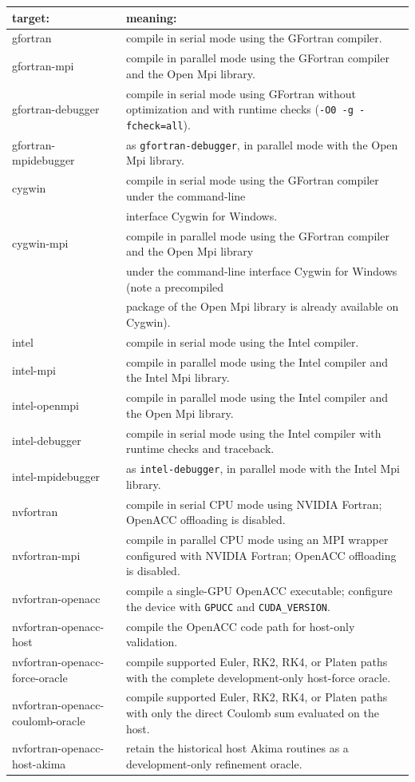 \begin{table}[H]
\begin{centering}
\begin{tabular}{p{}p{}}
\hline
\textbf{target:}  & \textbf{meaning:}\tabularnewline
\hline
\hline
gfortran  & compile in serial mode using the GFortran compiler.\tabularnewline
gfortran-mpi  & compile in parallel mode using the GFortran compiler and the Open
Mpi library.\tabularnewline
gfortran-debugger & compile in serial mode using GFortran without optimization and
with runtime checks (\texttt{-O0 -g -fcheck=all}).\tabularnewline
gfortran-mpidebugger & as \texttt{gfortran-debugger}, in parallel mode with the Open
Mpi library.\tabularnewline
cygwin  & compile in serial mode using the GFortran compiler under the command-line\tabularnewline
 & interface Cygwin for Windows.\tabularnewline
cygwin-mpi  & compile in parallel mode using the GFortran compiler and the Open
Mpi library\tabularnewline
 & under the command-line interface Cygwin for Windows (note a precompiled\tabularnewline
 & package of the Open Mpi library is already available on Cygwin).\tabularnewline
intel  & compile in serial mode using the Intel compiler.\tabularnewline
intel-mpi  & compile in parallel mode using the Intel compiler and the Intel Mpi
library.\tabularnewline
intel-openmpi  & compile in parallel mode using the Intel compiler and the Open Mpi
library.\tabularnewline
intel-debugger & compile in serial mode using the Intel compiler with runtime checks
and traceback.\tabularnewline
intel-mpidebugger & as \texttt{intel-debugger}, in parallel mode with the Intel Mpi
library.\tabularnewline
nvfortran & compile in serial CPU mode using NVIDIA Fortran; OpenACC offloading
is disabled.\tabularnewline
nvfortran-mpi & compile in parallel CPU mode using an MPI wrapper configured
with NVIDIA Fortran; OpenACC offloading is disabled.\tabularnewline
nvfortran-openacc & compile a single-GPU OpenACC executable; configure the
device with \texttt{GPUCC} and \texttt{CUDA\_VERSION}.\tabularnewline
nvfortran-openacc-host & compile the OpenACC code path for host-only validation.\tabularnewline
nvfortran-openacc-force-oracle & compile supported Euler, RK2, RK4, or Platen
paths with the complete development-only host-force oracle.\tabularnewline
nvfortran-openacc-coulomb-oracle & compile supported Euler, RK2, RK4, or Platen
paths with only the direct Coulomb sum evaluated on the host.\tabularnewline
nvfortran-openacc-host-akima & retain the historical host Akima routines as a
development-only refinement oracle.\tabularnewline

\end{tabular}
\end{centering}
\end{table}
